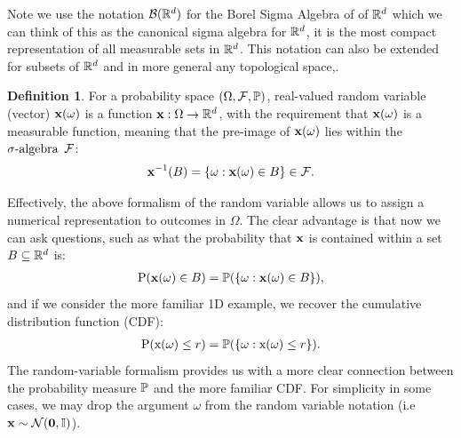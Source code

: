 \documentclass[a4paper,12pt,twoside,openright]{report}
\theoremstyle{definition}
\newtheorem{definition}{Definition}[section]
\begin{document}
Note we use the notation $\calB(\R^d)$ for the Borel Sigma Algebra of of $\R^d$ which we can think of this as the canonical sigma algebra for $\R^d$, it is the most compact representation of all measurable sets in $\R^d$. This notation can also be extended for subsets of $\R^d$ and in more general any topological space,.

\begin{definition}\label{def:random_variable}
For a probability space $\probspace$, real-valued random variable (vector) $\rvx(\omega)$ is a function $\rvx :\Omega \rightarrow \R^d$, with the requirement that $\rvx(\omega)$ is a measurable function, meaning that the pre-image of $\rvx(\omega)$  lies within the $\sigalg$ $\calF$:
\begin{align*}
    \rvx^{-1}(B)= \{\omega : \rvx(\omega) \in B \} \in \calF .
\end{align*}
\end{definition}
Effectively, the above formalism of the random variable allows us to assign a numerical representation to outcomes in $\Omega$. The clear advantage is that now we can ask questions, such as what the probability that $\rvx$ is contained within a set $B \subseteq \R^d$ is:
\begin{align*}
     \text{P}(\rvx(\omega) \in B) = \P( \{\omega : \rvx(\omega) \in B \} ),
\end{align*}
 and if we consider the more familiar 1D example, we recover the cumulative distribution function (CDF):
 \begin{align*}
     \text{P}(\rx(\omega) \leq r) = \P( \{\omega : \rx(\omega) \leq r \} ).
 \end{align*}
 The random-variable formalism provides us with a more clear connection between the probability measure $\P$ and the more familiar CDF. For simplicity in some cases, we may drop the argument $\omega$ from the random variable notation (i.e $\rvx \sim \mathcal{N}(\bm{0}, \mathbb{I})$). 
\end{document}
